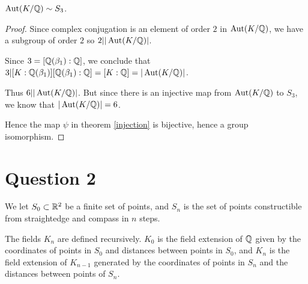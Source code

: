 \documentclass{unswmaths}
\begin{document}
\begin{theorem}
    $\operatorname{Aut}(K/\mathbb{Q})\sim S_3$.
\end{theorem}
\begin{proof}
    Since complex conjugation is an element of order $2$
    in $\operatorname{Aut}(K/\mathbb{Q})$, we have a subgroup of order $2$
    so $2||\operatorname{Aut}(K/\mathbb{Q})|$.
    
    Since $3 = [\mathbb{Q}(\beta_1):\mathbb{Q}]$,
    we conclude that $3|[K:\mathbb{Q}(\beta_1)][\mathbb{Q}(\beta_1):\mathbb{Q}] = [K:\mathbb{Q}] = |\operatorname{Aut}(K/\mathbb{Q})|$.
    
    Thus $6 | |\operatorname{Aut}(K/\mathbb{Q})|$. But since there
    is an injective map from $\operatorname{Aut}(K/\mathbb{Q})$ to $S_3$,
    we know that $|\operatorname{Aut}(K/\mathbb{Q})| = 6$.
    
    Hence the map $\psi$ in theorem \ref{injection} is bijective,
    hence a group isomorphism.
\end{proof}

\section*{Question 2}
    
We let $S_0 \subset \mathbb{R}^2$ be a finite set of points, and $S_n$
is the set of points constructible from straightedge and compass
in $n$ steps.

The fields $K_n$ are defined recursively. $K_0$
is the field extension of $\mathbb{Q}$ given by the coordinates of points in $S_0$
and distances between points in $S_0$, and $K_n$
is the field extension of $K_{n-1}$
generated by the coordinates of points in $S_n$
and the distances between points of $S_n$.
\end{document}
